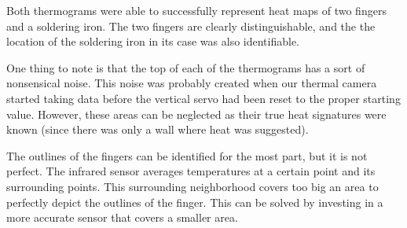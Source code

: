 \documentclass[11pt]{article}
\begin{document}
Both thermograms were able to successfully represent heat maps of two fingers and a soldering iron. The two fingers are clearly distinguishable, and the the location of the soldering iron in its case was also identifiable.

One thing to note is that the top of each of the thermograms has a sort of nonsensical noise. This noise was probably created when our thermal camera started taking data before the vertical servo had been reset to the proper starting value. However, these areas can be neglected as their true heat signatures were known (since there was only a wall where heat was suggested).

The outlines of the fingers can be identified for the most part, but it is not perfect. The infrared sensor averages temperatures at a certain point and its surrounding points. This surrounding neighborhood covers too big an area to perfectly depict the outlines of the finger. This can be solved by investing in a more accurate sensor that covers a smaller area.

\newpage
\end{document}
